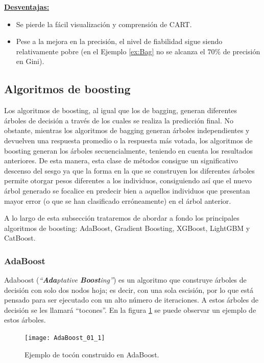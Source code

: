 \documentclass[12pt,twoside]{article}
\begin{document}
\textbf{\underline{Desventajas:}}
\begin{itemize}
\item Se pierde la fácil visualización y comprensión de CART.
\item Pese a la mejora en la precisión, el nivel de fiabilidad sigue siendo relativamente pobre (en el Ejemplo \ref{ex:Bag} no se alcanza el $70 \%$ de precisión en Gini).
\end{itemize}



\subsection{Algoritmos de boosting}
Los algoritmos de boosting, al igual que los de bagging, generan diferentes árboles de decisión a través de los cuales se realiza la predicción final. No obstante, mientras los algoritmos de bagging generan árboles independientes y devuelven una respuesta promedio o la respuesta más votada, los algoritmos de boosting generan los árboles secuencialmente, teniendo en cuenta los resultados anteriores. De esta manera, esta clase de métodos consigue un significativo descenso del sesgo ya que la forma en la que se construyen los diferentes árboles permite otorgar pesos diferentes a los individuos, consiguiendo así que el nuevo árbol generado se focalice en predecir bien a aquellos individuos que presentan mayor error (o que se han clasificado erróneamente) en el árbol anterior.

A lo largo de esta subsección trataremos de abordar a fondo los principales algoritmos de boosting: AdaBoost, Gradient Boosting, XGBoost, LightGBM y CatBoost.


\subsubsection{AdaBoost} \label{sec:AdaBoost}
Adaboost (\textit{``\textbf{Ada}ptative \textbf{Boost}ing''}) \cite{FR01} es un algoritmo que construye árboles de decisión con solo dos nodos hoja; es decir, con una sola escisión, por lo que está pensado para ser ejecutado con un alto número de iteraciones. A estos árboles de decisión se les llamará ``tocones''. En la figura \ref{fig: AdaBoost_01} se puede observar un ejemplo de estos árboles.
\begin{figure}[h]
\centering
\texttt{[image: AdaBoost\_01\_1]}
\caption{Ejemplo de tocón construido en AdaBoost.}
\label{fig: AdaBoost_01}
\end{figure}
\end{document}
